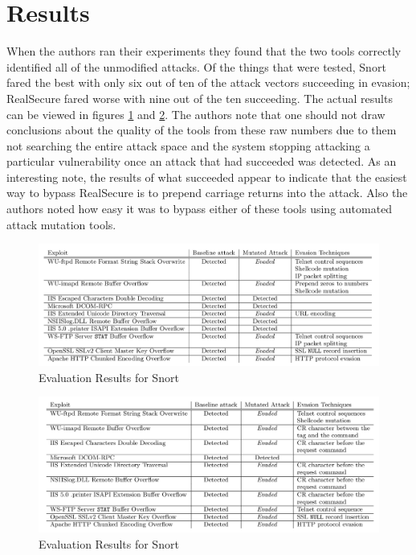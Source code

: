 \documentclass{reading_glasses}
\begin{document}
\section{Results}
When the authors ran their experiments they found that the two tools correctly identified all of the unmodified attacks.   Of the things that were tested, Snort fared the best with only six out of ten of the attack vectors succeeding in evasion;  RealSecure fared worse with nine out of the ten succeeding. The actual results can be viewed in figures \ref{fig:snortRes} and \ref{fig:realSecRes}.  The authors note that one should not draw conclusions about the quality of the tools from these raw numbers due to them not searching the entire attack space and the system stopping attacking a particular vulnerability once an attack that had succeeded was detected.  As an interesting note, the results of what succeeded appear to indicate that the easiest way to bypass RealSecure is to prepend carriage returns into the attack.   Also the authors noted how easy it was to bypass either of these tools using automated attack mutation tools.  \cite{vigna2004testing}

\begin{figure}
	\centering
	\includegraphics[width=1.0\textwidth]{SnortResults.png}
	\caption{Evaluation Results for Snort}
	\label{fig:snortRes}
\end{figure}

\begin{figure}
	\centering
	\includegraphics[width=1.0\textwidth]{IISRealSecureResults.png}
	\caption{Evaluation Results for Snort}
	\label{fig:realSecRes}
\end{figure}
\end{document}
